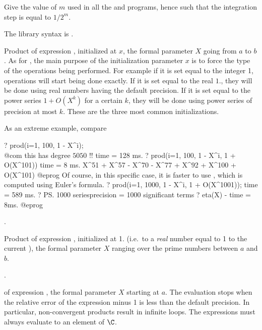 \label{se:intnumstep}
Give the value of $m$ used in all the
 and  programs, hence such that the integration
step is equal to $1/2^m$.

The library syntax is .

\label{se:prod}
Product of expression
, initialized at $x$, the formal parameter $X$ going from $a$ to
$b$. As for , the main purpose of the initialization parameter $x$
is to force the type of the operations being performed. For example if it is
set equal to the integer 1, operations will start being done exactly. If it
is set equal to the real $1.$, they will be done using real numbers having
the default precision. If it is set equal to the power series $1+O(X^k)$ for
a certain $k$, they will be done using power series of precision at most $k$.
These are the three most common initializations.

\noindent As an extreme example, compare

\bprog
? prod(i=1, 100, 1 - X^i);  \\@com this has degree $5050$ !!
time = 128 ms.
? prod(i=1, 100, 1 - X^i, 1 + O(X^101))
time = 8 ms.
X^51 + X^57 - X^70 - X^77 + X^92 + X^100 + O(X^101)
@eprog\noindent
Of course, in  this specific case, it is faster to use ,
which is computed using Euler's formula.
\bprog
? prod(i=1, 1000, 1 - X^i, 1 + O(X^1001));
time = 589 ms.
? \ps1000
seriesprecision = 1000 significant terms
? eta(X) - %
time = 8ms.
@eprog

.

\label{se:prodeuler}
Product of expression ,
initialized at 1. (i.e.~to a \emph{real} number equal to 1 to the current
), the formal parameter $X$ ranging over the prime numbers
between $a$ and $b$.

.

\label{se:prodinf}
 of
expression , the formal parameter $X$ starting at $a$. The evaluation
stops when the relative error of the expression minus 1 is less than the
default precision. In particular, non-convergent products result in infinite
loops. The expressions must always evaluate to an element of $\C$.

